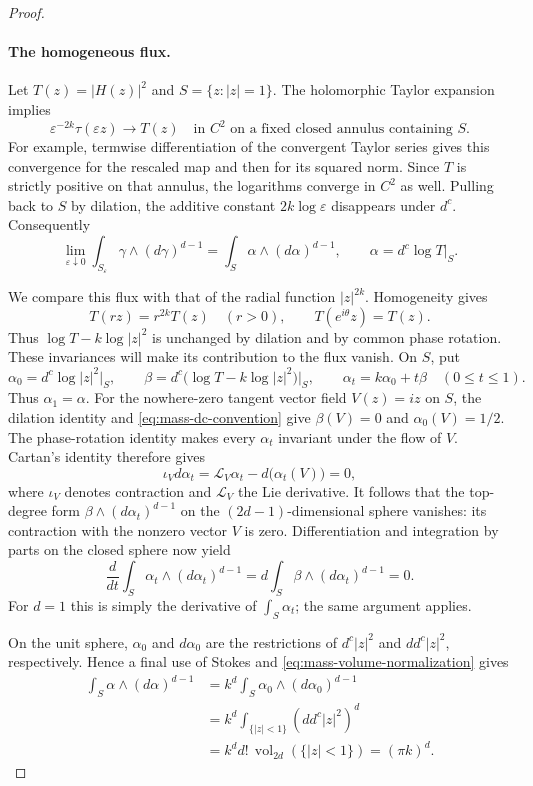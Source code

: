 \begin{proof}
\paragraph{The homogeneous flux.}
Let $T(z)=|H(z)|^2$ and $S=\{z:|z|=1\}$. The holomorphic Taylor
expansion implies
\[
\varepsilon^{-2k}\tau(\varepsilon z)\longrightarrow T(z)
\quad\text{in }C^2\text{ on a fixed closed annulus containing }S.
\]
For example, termwise differentiation of the convergent Taylor series
gives this convergence for the rescaled map and then for its squared
norm. Since $T$ is strictly positive on that annulus, the logarithms
converge in $C^2$ as well. Pulling back to $S$ by dilation, the additive
constant $2k\log\varepsilon$ disappears under $d^c$. Consequently
\begin{equation}\label{eq:mass-homogeneous-limit}
\lim_{\varepsilon\downarrow0}
 \int_{S_\varepsilon}\gamma\wedge(d\gamma)^{d-1}
 =\int_S\alpha\wedge(d\alpha)^{d-1},
\qquad \alpha=d^c\log T\big|_S.
\end{equation}

We compare this flux with that of the radial function $|z|^{2k}$.
Homogeneity gives
\[
T(rz)=r^{2k}T(z)\quad(r>0),\qquad T(e^{i\theta}z)=T(z).
\]
Thus $\log T-k\log|z|^2$ is unchanged by dilation and by common phase
rotation. These invariances will make its contribution to the flux
vanish. On $S$, put
\[
\alpha_0=d^c\log|z|^2\big|_S,
\qquad
\beta=d^c\bigl(\log T-k\log|z|^2\bigr)\big|_S,
\qquad
\alpha_t=k\alpha_0+t\beta\quad(0\leq t\leq1).
\]
Thus $\alpha_1=\alpha$.
For the nowhere-zero tangent vector field $V(z)=iz$ on $S$, the dilation
identity and \eqref{eq:mass-dc-convention} give
$\beta(V)=0$ and $\alpha_0(V)=1/2$. The phase-rotation identity makes every
$\alpha_t$ invariant under the flow of $V$. Cartan's identity therefore
gives
\[
\iota_Vd\alpha_t
 =\mathcal L_V\alpha_t-d\bigl(\alpha_t(V)\bigr)=0,
\]
where $\iota_V$ denotes contraction and $\mathcal L_V$ the Lie derivative.
It follows that the top-degree form
$\beta\wedge(d\alpha_t)^{d-1}$ on the $(2d-1)$-dimensional sphere
vanishes: its contraction with the nonzero vector $V$ is zero.
Differentiation and integration by parts on the closed sphere now yield
\[
\frac{d}{dt}\int_S\alpha_t\wedge(d\alpha_t)^{d-1}
 =d\int_S\beta\wedge(d\alpha_t)^{d-1}=0.
\]
For $d=1$ this is simply the derivative of $\int_S\alpha_t$; the same
argument applies.

On the unit sphere, $\alpha_0$ and $d\alpha_0$ are the restrictions of
$d^c|z|^2$ and $dd^c|z|^2$, respectively. Hence a final use of Stokes and
\eqref{eq:mass-volume-normalization} gives
\begin{align*}
\int_S\alpha\wedge(d\alpha)^{d-1}
 &=k^d\int_S\alpha_0\wedge(d\alpha_0)^{d-1}\\
 &=k^d\int_{\{|z|<1\}}(dd^c|z|^2)^d\\
 &=k^d d!\,\operatorname{vol}_{2d}(\{|z|<1\})
  =(\pi k)^d.
\end{align*}


\end{proof}
